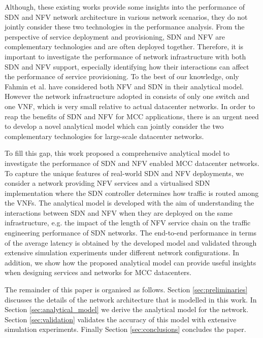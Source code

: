 Although, these existing works provide some insights into the performance of SDN and NFV network architecture in various network scenarios, they do not jointly consider these two technologies in the performance analysis. From the perspective of service deployment and provisioning, SDN and NFV are complementary technologies and are often deployed together. Therefore, it is important to investigate the performance of network infrastructure with both SDN and NFV support, especially identifying how their interactions can affect the performance of service provisioning. To the best of our knowledge, only Fahmin et al. \cite{FahminLHLS17} have considered both NFV and SDN in their analytical model. However the network infrastructure adopted in \cite{FahminLHLS17} consists of only one switch and one VNF, which is very small relative to actual datacenter networks. In order to reap the benefits of SDN and NFV for MCC applications, there is an urgent need to develop a novel analytical model which can jointly consider the two complementary technologies for large-scale datacenter networks.
 
To fill this gap, this work proposed a comprehensive analytical model to investigate the performance of SDN and NFV enabled MCC datacenter networks. To capture the unique features of real-world SDN and NFV deployments, we consider a network providing NFV services and a virtualised SDN implementation where the SDN controller determines how traffic is routed among the VNFs. The analytical model is developed with the aim of understanding the interactions between SDN and NFV when they are deployed on the same infrastructure, e.g. the impact of the length of NFV service chain on the traffic engineering performance of SDN networks. The end-to-end performance in terms of the average latency is obtained by the developed model and validated through extensive simulation experiments under different network configurations. In addition, we show how the proposed analytical model can provide useful insights when designing services and networks for MCC datacenters.

The remainder of this paper is organised as follows. Section \ref{sec:preliminaries} discusses the details of the network architecture that is modelled in this work. In Section \ref{sec:analytical_model} we derive the analytical model for the network. Section \ref{sec:validation} validates the accuracy of this model with extensive simulation experiments. Finally Section \ref{sec:conclusions} concludes the paper.